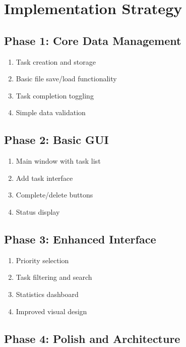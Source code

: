 \documentclass[
  letterpaper,
  DIV=11,
  numbers=noendperiod,
  oneside]{scrreprt}
\providecommand{\tightlist}{%
  \setlength{\itemsep}{0pt}\setlength{\parskip}{0pt}}\usepackage{longtable,booktabs,array}
\begin{document}
\section{Implementation Strategy}\label{implementation-strategy-11}

\subsection{Phase 1: Core Data
Management}\label{phase-1-core-data-management}

\begin{enumerate}
\def\labelenumi{\arabic{enumi}.}
\tightlist
\item
  Task creation and storage
\item
  Basic file save/load functionality
\item
  Task completion toggling
\item
  Simple data validation
\end{enumerate}

\subsection{Phase 2: Basic GUI}\label{phase-2-basic-gui-1}

\begin{enumerate}
\def\labelenumi{\arabic{enumi}.}
\tightlist
\item
  Main window with task list
\item
  Add task interface
\item
  Complete/delete buttons
\item
  Status display
\end{enumerate}

\subsection{Phase 3: Enhanced
Interface}\label{phase-3-enhanced-interface}

\begin{enumerate}
\def\labelenumi{\arabic{enumi}.}
\tightlist
\item
  Priority selection
\item
  Task filtering and search
\item
  Statistics dashboard
\item
  Improved visual design
\end{enumerate}

\subsection{Phase 4: Polish and
Architecture}\label{phase-4-polish-and-architecture}
\end{document}
